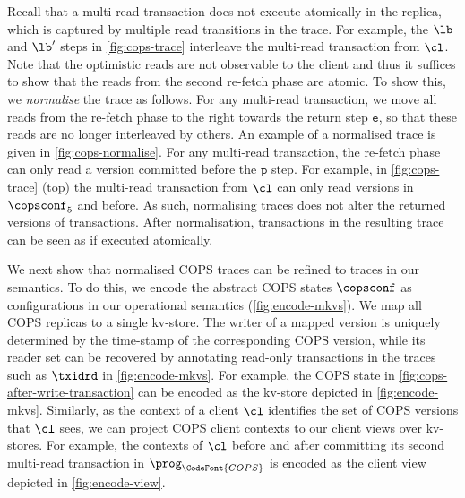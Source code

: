 

Recall that a multi-read transaction does not execute atomically in the replica,
which is captured by multiple read transitions in the trace.
For example, the \( \lb\) and \( \lb' \) steps in \cref{fig:cops-trace}
interleave the multi-read transaction from \( \cl \).
Note that the optimistic reads are not observable to the client and
thus it suffices to show that the reads from the second re-fetch phase are atomic.
To show this, we \emph{normalise} the trace as follows. 
For any multi-read transaction, 
we move all reads from the re-fetch phase to the right towards the return step \( \mathtt{e}\),
so that these reads are no longer interleaved by others.
An example of a normalised trace is given in \cref{fig:cops-normalise}.
For any multi-read transaction,
the re-fetch phase can only read a version committed before the \( \mathtt{p}\) step.
For example, in \cref{fig:cops-trace} (top)
the multi-read transaction from \( \cl \) can only read versions in \( \copsconf_5 \) and before.
As such, normalising traces does not alter the returned versions of transactions.
After normalisation, transactions in the resulting trace can be seen as if executed atomically. 

We next show that normalised COPS traces can be refined to traces in our semantics.
To do this, we encode the abstract COPS states \(\copsconf \) as configurations
in our operational semantics (\cref{fig:encode-mkvs}). 
We map all COPS replicas to a single kv-store.
The writer of a mapped version is uniquely
determined by the time-stamp of the corresponding COPS version, 
while its reader set 
can be recovered by annotating read-only transactions in the traces such as \( \txidrd \) in \cref{fig:encode-mkvs}.
For example, the COPS state in \cref{fig:cops-after-write-transaction}
can be encoded as the kv-store depicted in \cref{fig:encode-mkvs}.
Similarly, as the context of a client $\cl$ identifies the set of COPS versions that $\cl$ sees, 
we can project COPS client contexts to our client views over kv-stores. 
For example, the contexts of \( \cl \) 
before and after committing its second multi-read transaction in \( \prog_{\CodeFont{COPS}} \) 
is encoded as the client view depicted in \cref{fig:encode-view}.

